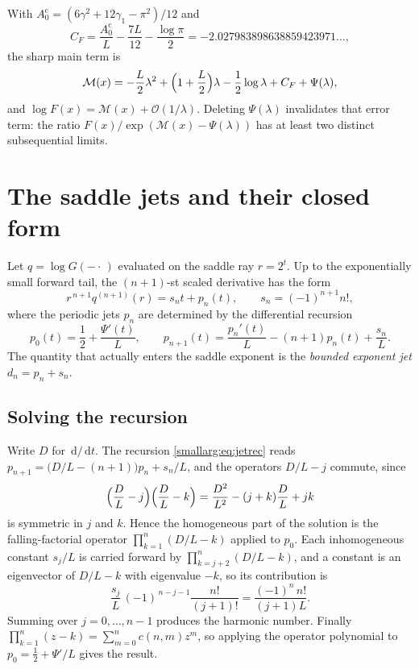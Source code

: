 \documentclass[11pt,oneside]{article}
\theoremstyle{definition}
\theoremstyle{remark}
\newcommand{\dd}{\,\mathrm d}
\newcommand{\bigO}{\mathcal O}
\begin{document}
With $A_0^{\mathrm{c}}=(6\gamma^2+12\gamma_1-\pi^2)/12$ and
\[
  C_F=\frac{A_0^{\mathrm{c}}}{L}-\frac{7L}{12}-\frac{\log\pi}{2}
     =-2.027983898638859423971\dots,
\]
the sharp main term is
\begin{equation}\label{smallarg:eq:main}
  \mathcal M(x)=-\frac L2\lambda^2+\Bigl(1+\frac L2\Bigr)\lambda
    -\frac12\log\lambda+C_F+\Psi(\lambda),
\end{equation}
and $\log F(x)=\mathcal M(x)+\bigO(1/\lambda)$.  Deleting $\Psi(\lambda)$
invalidates that error term: the ratio $F(x)/\exp(\mathcal M(x)-\Psi(\lambda))$
has at least two distinct subsequential limits.

\section{The saddle jets and their closed form}\label{smallarg:sec:jets}

Let $q=\log G(-\cdot\,)$ evaluated on the saddle ray $r=2^t$.  Up to the
exponentially small forward tail, the $(n+1)$-st scaled derivative has the form
\[
  r^{\,n+1}q^{(n+1)}(r)=s_nt+p_n(t),\qquad s_n=(-1)^{n+1}n!,
\]
where the periodic jets $p_n$ are determined by the differential recursion
\begin{equation}\label{smallarg:eq:jetrec}
  p_0(t)=\frac12+\frac{\Psi'(t)}{L},
  \qquad
  p_{n+1}(t)=\frac{p_n'(t)}{L}-(n+1)p_n(t)+\frac{s_n}{L}.
\end{equation}
The quantity that actually enters the saddle exponent is the \emph{bounded
exponent jet} $d_n=p_n+s_n$.

\subsection{Solving the recursion}

Write $D$ for $\dd/\dd t$.  The recursion \cref{smallarg:eq:jetrec} reads
$p_{n+1}=\bigl(D/L-(n+1)\bigr)p_n+s_n/L$, and the operators $D/L-j$ commute,
since
\[
  \Bigl(\frac DL-j\Bigr)\Bigl(\frac DL-k\Bigr)
   =\frac{D^2}{L^2}-(j+k)\frac DL+jk
\]
is symmetric in $j$ and $k$.  Hence the homogeneous part of the solution is the
falling-factorial operator $\prod_{k=1}^n(D/L-k)$ applied to $p_0$.  Each
inhomogeneous constant $s_j/L$ is carried forward by
$\prod_{k=j+2}^n(D/L-k)$, and a constant is an eigenvector of $D/L-k$ with
eigenvalue $-k$, so its contribution is
\[
  \frac{s_j}{L}\,(-1)^{\,n-j-1}\frac{n!}{(j+1)!}
   =\frac{(-1)^n\,n!}{(j+1)L}.
\]
Summing over $j=0,\dots,n-1$ produces the harmonic number.  Finally
$\prod_{k=1}^n(z-k)=\sum_{m=0}^nc(n,m)z^m$, so applying the operator polynomial
to $p_0=\tfrac12+\Psi'/L$ gives the result.
\end{document}
